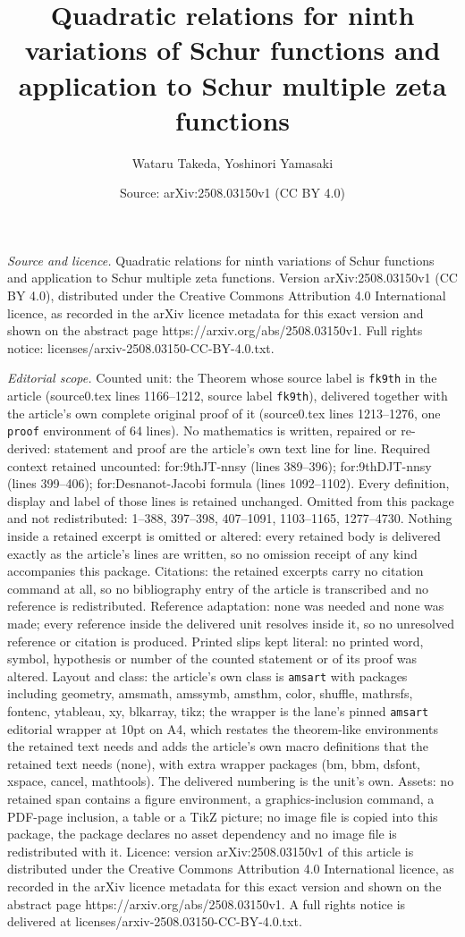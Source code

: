 \documentclass[10pt,a4paper]{amsart}
\title[Quadratic relations for ninth variations of Schur functions ]{Quadratic relations for ninth variations of Schur functions and application to Schur multiple zeta functions}
\author{Wataru Takeda, Yoshinori Yamasaki}
\date{Source: arXiv:2508.03150v1 (CC BY 4.0)}
\begin{document}
\maketitle

\noindent\emph{Source and licence.} Quadratic relations for ninth variations of Schur functions and application to Schur multiple zeta functions. Version arXiv:2508.03150v1 (CC BY 4.0), distributed under the Creative Commons Attribution 4.0 International licence, as recorded in the arXiv licence metadata for this exact version and shown on the abstract page https://arxiv.org/abs/2508.03150v1. Full rights notice: licenses/arxiv-2508.03150-CC-BY-4.0.txt.\par\smallskip

\noindent\textit{Editorial scope.} Counted unit: the Theorem whose source label is \texttt{fk9th} in the article (source0.tex lines 1166--1212, source label \texttt{fk9th}), delivered together with the article's own complete original proof of it (source0.tex lines 1213--1276, one \texttt{proof} environment of 64 lines). No mathematics is written, repaired or re-derived: statement and proof are the article's own text line for line. Required context retained uncounted: for:9thJT-nnsy (lines 389--396); for:9thDJT-nnsy (lines 399--406); for:Desnanot-Jacobi formula (lines 1092--1102). Every definition, display and label of those lines is retained unchanged. Omitted from this package and not redistributed: 1--388, 397--398, 407--1091, 1103--1165, 1277--4730. Nothing inside a retained excerpt is omitted or altered: every retained body is delivered exactly as the article's lines are written, so no omission receipt of any kind accompanies this package. Citations: the retained excerpts carry no citation command at all, so no bibliography entry of the article is transcribed and no reference is redistributed. Reference adaptation: none was needed and none was made; every reference inside the delivered unit resolves inside it, so no unresolved reference or citation is produced. Printed slips kept literal: no printed word, symbol, hypothesis or number of the counted statement or of its proof was altered. Layout and class: the article's own class is \texttt{amsart} with packages including geometry, amsmath, amssymb, amsthm, color, shuffle, mathrsfs, fontenc, ytableau, xy, blkarray, tikz; the wrapper is the lane's pinned \texttt{amsart} editorial wrapper at 10pt on A4, which restates the theorem-like environments the retained text needs and adds the article's own macro definitions that the retained text needs (none), with extra wrapper packages (bm, bbm, dsfont, xspace, cancel, mathtools). The delivered numbering is the unit's own. Assets: no retained span contains a figure environment, a graphics-inclusion command, a PDF-page inclusion, a table or a TikZ picture; no image file is copied into this package, the package declares no asset dependency and no image file is redistributed with it. Licence: version arXiv:2508.03150v1 of this article is distributed under the Creative Commons Attribution 4.0 International licence, as recorded in the arXiv licence metadata for this exact version and shown on the abstract page https://arxiv.org/abs/2508.03150v1. A full rights notice is delivered at licenses/arxiv-2508.03150-CC-BY-4.0.txt. 
\end{document}
